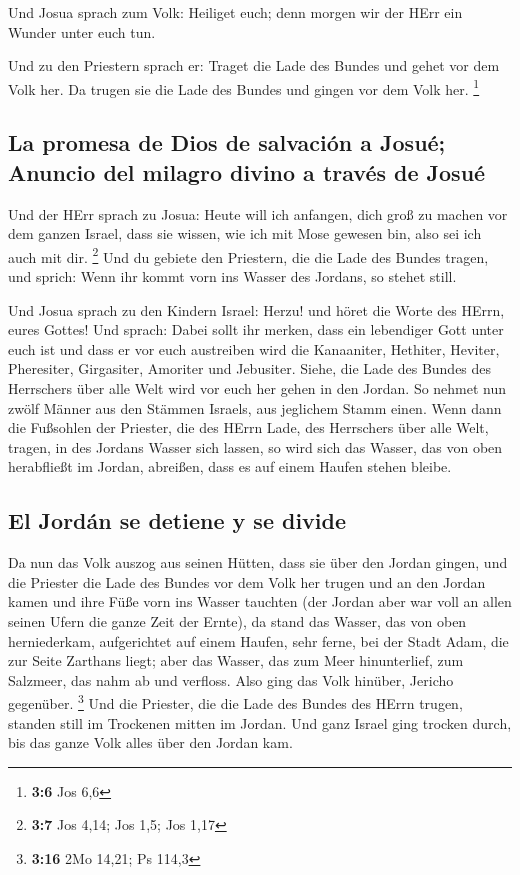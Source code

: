  Und Josua sprach zum Volk: Heiliget euch; denn morgen wir
der HErr ein Wunder unter euch tun.

 Und zu den Priestern sprach er: Traget die Lade des
Bundes und gehet vor dem Volk her. Da trugen sie die Lade des Bundes und
gingen vor dem Volk her. \footnote{\textbf{3:6} Jos 6,6}

\hypertarget{la-promesa-de-dios-de-salvaciuxf3n-a-josuuxe9-anuncio-del-milagro-divino-a-travuxe9s-de-josuuxe9}{%
\subsection{La promesa de Dios de salvación a Josué; Anuncio del milagro
divino a través de
Josué}\label{la-promesa-de-dios-de-salvaciuxf3n-a-josuuxe9-anuncio-del-milagro-divino-a-travuxe9s-de-josuuxe9}}

 Und der HErr sprach zu Josua: Heute will ich anfangen,
dich groß zu machen vor dem ganzen Israel, dass sie wissen, wie ich mit
Mose gewesen bin, also sei ich auch mit dir. \footnote{\textbf{3:7} Jos
  4,14; Jos 1,5; Jos 1,17}  Und du gebiete den Priestern,
die die Lade des Bundes tragen, und sprich: Wenn ihr kommt vorn ins
Wasser des Jordans, so stehet still.

 Und Josua sprach zu den Kindern Israel: Herzu! und höret
die Worte des HErrn, eures Gottes!  Und sprach: Dabei
sollt ihr merken, dass ein lebendiger Gott unter euch ist und dass er
vor euch austreiben wird die Kanaaniter, Hethiter, Heviter, Pheresiter,
Girgasiter, Amoriter und Jebusiter.  Siehe, die Lade des
Bundes des Herrschers über alle Welt wird vor euch her gehen in den
Jordan.  So nehmet nun zwölf Männer aus den Stämmen
Israels, aus jeglichem Stamm einen.  Wenn dann die
Fußsohlen der Priester, die des HErrn Lade, des Herrschers über alle
Welt, tragen, in des Jordans Wasser sich lassen, so wird sich das
Wasser, das von oben herabfließt im Jordan, abreißen, dass es auf einem
Haufen stehen bleibe.

\hypertarget{el-jorduxe1n-se-detiene-y-se-divide}{%
\subsection{El Jordán se detiene y se
divide}\label{el-jorduxe1n-se-detiene-y-se-divide}}

 Da nun das Volk auszog aus seinen Hütten, dass sie über
den Jordan gingen, und die Priester die Lade des Bundes vor dem Volk her
trugen  und an den Jordan kamen und ihre Füße vorn ins
Wasser tauchten (der Jordan aber war voll an allen seinen Ufern die
ganze Zeit der Ernte),  da stand das Wasser, das von oben
herniederkam, aufgerichtet auf einem Haufen, sehr ferne, bei der Stadt
Adam, die zur Seite Zarthans liegt; aber das Wasser, das zum Meer
hinunterlief, zum Salzmeer, das nahm ab und verfloss. Also ging das Volk
hinüber, Jericho gegenüber. \footnote{\textbf{3:16} 2Mo 14,21; Ps 114,3}
 Und die Priester, die die Lade des Bundes des HErrn
trugen, standen still im Trockenen mitten im Jordan. Und ganz Israel
ging trocken durch, bis das ganze Volk alles über den Jordan kam.


